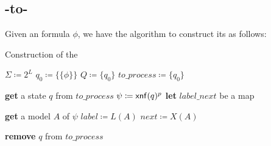 \subsection{\ltlf-to-\TDFA}
Given an \ltlf formula $\phi $, we have the algorithm to construct its \TDFA as follows:\\

\begin{algorithm}[H]
  \caption{Construction of the \TDFA}
  \LinesNumbered
  $\Sigma\coloneqq 2^L$\;
  $q_0\coloneqq\{\{\phi\}\}$\;
  $Q\coloneqq\{q_0\}$\;
  $to\_process\coloneqq\{q_0\}$\;
  {
    \textbf{get} a state $q$ from $to\_process$\;
    $\psi\coloneqq{\sf xnf}(q)^p$\;
    \textbf{let}  $label\_next$ be a map\;
    {
      \textbf{get} a model $A$ of $\psi$\;
      $label\coloneqq L(A)$\;
      $next\coloneqq X(A)$\;
      {
      
      }
    }
    \textbf{remove} $q$ from $to\_process$\;
  }
\end{algorithm}
